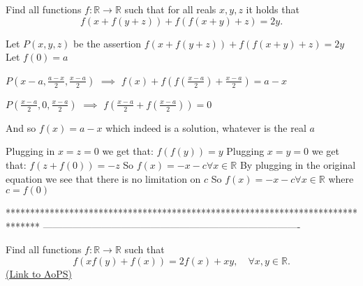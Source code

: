 \begin{solution}
	\begin{tcolorbox}Find all functions $f : \mathbb R \to \mathbb R$ such that for all reals $x, y, z$ it holds that
\[f(x + f(y + z)) + f(f(x + y) + z) = 2y.\]\end{tcolorbox}
Let $P(x,y,z)$ be the assertion $f(x+f(y+z))+f(f(x+y)+z)=2y$
Let $f(0)=a$

$P(x-a,\frac {a-x}2,\frac {x-a}2)$ $\implies$ $f(x)+f(f(\frac {x-a}2)+\frac {x-a}2)=a-x$

$P(\frac{x-a}2,0,\frac{x-a}2)$ $\implies$ $f(\frac{x-a}2+f(\frac{x-a}2))=0$

And so $\boxed{f(x)=a-x}$ which indeed is a solution, whatever is the real $a$
\end{solution}



\begin{solution}
	Plugging in $x=z=0$ we get that:
$f(f(y))=y$
Plugging $x=y=0$ we get that:
$f(z+f(0))=-z$
So $f(x)=-x-c \forall x\in\mathbb{R}$
By plugging in the original equation we see that there is no limitation on $c$
So $\boxed{f(x)=-x-c}\forall x\in\mathbb{R}$ where $c=f(0)$
\end{solution}
*******************************************************************************
-------------------------------------------------------------------------------

\begin{problem}
	Find all functions $f : \mathbb{R} \to \mathbb{R}$ such that
\[f(xf(y) + f(x)) = 2f(x) + xy, \quad \forall x,y \in \mathbb{R}.\]
	\flushright \href{https://artofproblemsolving.com/community/c6h415230}{(Link to AoPS)}
\end{problem}



